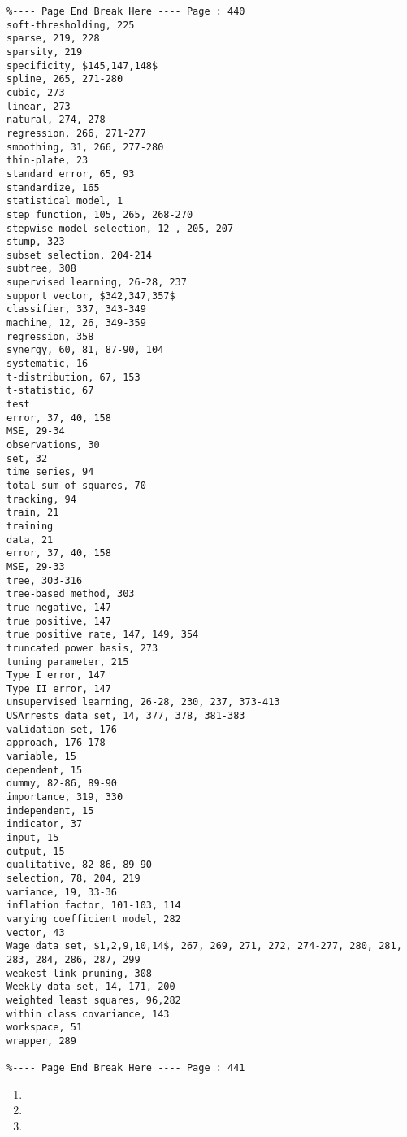 \documentclass[10pt]{article}
\begin{document}
\begin{verbatim}
%---- Page End Break Here ---- Page : 440
soft-thresholding, 225
sparse, 219, 228
sparsity, 219
specificity, $145,147,148$
spline, 265, 271-280
cubic, 273
linear, 273
natural, 274, 278
regression, 266, 271-277
smoothing, 31, 266, 277-280
thin-plate, 23
standard error, 65, 93
standardize, 165
statistical model, 1
step function, 105, 265, 268-270
stepwise model selection, 12 , 205, 207
stump, 323
subset selection, 204-214
subtree, 308
supervised learning, 26-28, 237
support vector, $342,347,357$
classifier, 337, 343-349
machine, 12, 26, 349-359
regression, 358
synergy, 60, 81, 87-90, 104
systematic, 16
t-distribution, 67, 153
t-statistic, 67
test
error, 37, 40, 158
MSE, 29-34
observations, 30
set, 32
time series, 94
total sum of squares, 70
tracking, 94
train, 21
training
data, 21
error, 37, 40, 158
MSE, 29-33
tree, 303-316
tree-based method, 303
true negative, 147
true positive, 147
true positive rate, 147, 149, 354
truncated power basis, 273
tuning parameter, 215
Type I error, 147
Type II error, 147
unsupervised learning, 26-28, 230, 237, 373-413
USArrests data set, 14, 377, 378, 381-383
validation set, 176
approach, 176-178
variable, 15
dependent, 15
dummy, 82-86, 89-90
importance, 319, 330
independent, 15
indicator, 37
input, 15
output, 15
qualitative, 82-86, 89-90
selection, 78, 204, 219
variance, 19, 33-36
inflation factor, 101-103, 114
varying coefficient model, 282
vector, 43
Wage data set, $1,2,9,10,14$, 267, 269, 271, 272, 274-277, 280, 281, 283, 284, 286, 287, 299
weakest link pruning, 308
Weekly data set, 14, 171, 200
weighted least squares, 96,282
within class covariance, 143
workspace, 51
wrapper, 289

%---- Page End Break Here ---- Page : 441
\end{verbatim}

\begin{enumerate}
  \item 
  \item 
  \item 
\end{enumerate}
\end{document}

